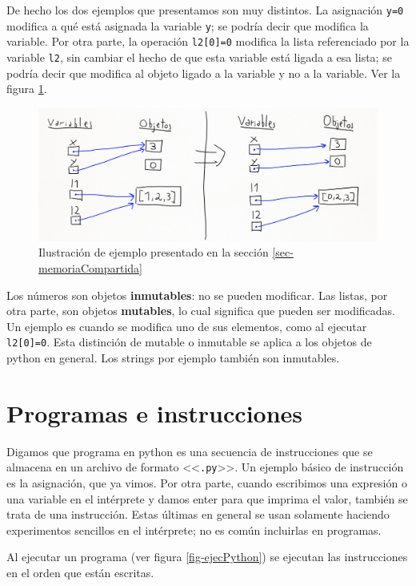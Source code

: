 \documentclass[a4paper, 12pt]{report}
\theoremstyle{definition}
\begin{document}
De hecho los dos ejemplos que presentamos son muy distintos. La asignación {\tt y=0} modifica a qué está asignada la variable {\tt y}; se podría decir que modifica la variable. Por otra parte, la operación {\tt l2[0]=0} modifica la lista referenciado por la variable {\tt l2}, sin cambiar el hecho de que esta variable está ligada a esa lista; se podría decir que modifica al objeto ligado a la variable y no a la variable. Ver la figura \ref{fig-ejemploVarMem}.

\begin{figure}
	\centering
	\includegraphics[scale=0.3]{ejemploVarMem.png}
	\caption{Ilustración de ejemplo presentado en la sección \ref{sec-memoriaCompartida}}
	\label{fig-ejemploVarMem}
\end{figure}

Los números son objetos {\bf inmutables}: no se pueden modificar. Las listas, por otra parte, son objetos {\bf mutables}, lo cual significa que pueden ser modificadas. Un ejemplo es cuando se modifica uno de sus elementos, como al ejecutar {\tt l2[0]=0}. Esta distinción de mutable o inmutable se aplica a los objetos de python en general. Los strings por ejemplo también son inmutables.



\section{Programas e instrucciones}

Digamos que programa en python es una secuencia de instrucciones que se almacena en un archivo de formato <<{\tt .py}>>. Un ejemplo básico de instrucción es la asignación, que ya vimos. Por otra parte, cuando escribimos una expresión o una variable en el intérprete y damos enter para que imprima el valor, también se trata de una instrucción. Estas últimas en general se usan solamente haciendo experimentos sencillos en el intérprete; no es común incluirlas en programas.

Al ejecutar un programa (ver figura \ref{fig-ejecPython}) se ejecutan las instrucciones en el orden que están escritas.
\end{document}
